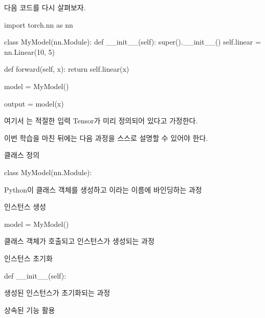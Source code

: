 다음 코드를 다시 살펴보자.

\begin{dhkcode}
import torch.nn as nn


class MyModel(nn.Module):
    def __init__(self):
        super().__init__()
        self.linear = nn.Linear(10, 5)

    def forward(self, x):
        return self.linear(x)

model = MyModel()

output = model(x)
\end{dhkcode}

여기서 는 적절한 입력 Tensor가 미리 정의되어 있다고 가정한다.

이번 학습을 마친 뒤에는 다음 과정을 스스로 설명할 수 있어야 한다.

\begin{dhknote}
\begin{dhksmry}[centered]
클래스 정의
\end{dhksmry}
\end{dhknote}

\begin{dhkcode}
class MyModel(nn.Module):
\end{dhkcode}

Python이 클래스 객체를 생성하고 이라는 이름에 바인딩하는 과정

\begin{dhknote}
\begin{dhksmry}[centered]
인스턴스 생성
\end{dhksmry}
\end{dhknote}

\begin{dhkcode}
model = MyModel()
\end{dhkcode}

클래스 객체가 호출되고 인스턴스가 생성되는 과정

\begin{dhknote}
\begin{dhksmry}[centered]
인스턴스 초기화
\end{dhksmry}
\end{dhknote}

\begin{dhkcode}
def __init__(self):
\end{dhkcode}

생성된 인스턴스가 초기화되는 과정

\begin{dhknote}
\begin{dhksmry}[centered]
상속된 기능 활용
\end{dhksmry}
\end{dhknote}

